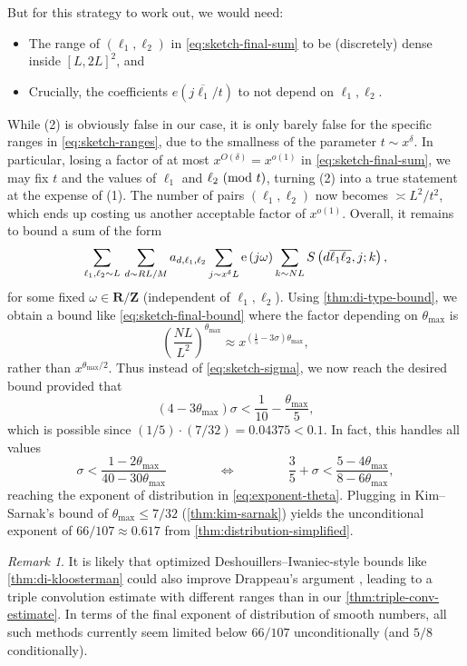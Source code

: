 \documentclass[reqno,11pt]{amsart}
\theoremstyle{definition}
\theoremstyle{remark}
\newtheorem*{remark}{Remark}
\numberwithin{equation}{section}
\newcommand{\Z}{\mathbf{Z}}
\newcommand{\R}{\mathbf{R}}
\newcommand{\e}{\textnormal{e}}
\renewcommand{\bar}{\overline}
\renewcommand{\pmod}[1]{\ (\textnormal{mod } #1)}
\begin{document}
But for this strategy to work out, we would need:
\begin{itemize}
    \item[(1).] The range of $(\ell_1, \ell_2)$ in \cref{eq:sketch-final-sum} to be (discretely) dense inside $[L, 2L]^2$, and
    \item[(2).] Crucially, the coefficients $e\left(j \bar{\ell_1} / t \right)$ to not depend on $\ell_1, \ell_2$.
\end{itemize}
While (2) is obviously false in our case, it is only barely false for the specific ranges in \cref{eq:sketch-ranges}, due to the smallness of the parameter $t \sim x^\delta$. In particular, losing a factor of at most $x^{O(\delta)} = x^{o(1)}$ in \cref{eq:sketch-final-sum}, we may fix $t$ and the values of $\ell_1$ and $\ell_2 \pmod{t}$, turning (2) into a true statement at the expense of (1). The number of pairs $(\ell_1, \ell_2)$ now becomes $\asymp L^2/t^2$, which ends up costing us another acceptable factor of $x^{o(1)}$. Overall, it remains to bound a sum of the form
\begin{equation} \label{eq:sketch-kloosterman-2}
    \sum_{\ell_1,\ell_2 \sim L}\, \sum_{d \sim RL/M} a_{d,\ell_1,\ell_2} \sum_{j \sim x^\delta L} \e\left(j\omega\right) 
    \sum_{k \sim NL} S\left(d \bar{\ell_1 \ell_2}, j; k\right),
\end{equation}
for some fixed $\omega \in \R/\Z$ (independent of $\ell_1, \ell_2$). Using \cref{thm:di-type-bound}, we obtain a bound like \cref{eq:sketch-final-bound} where the factor depending on $\theta_{\max}$ is
\[
    \left(\frac{NL}{L^2}\right)^{\theta_{\max}} \approx x^{\left(\frac{1}{5}-3\sigma\right) \theta_{\max}},
\]
rather than $x^{\theta_{\max}/2}$. Thus instead of \cref{eq:sketch-sigma}, we now reach the desired bound provided that
\[
    \left(4 - 3\theta_{\max}\right)\sigma < \frac{1}{10} - \frac{\theta_{\max}}{5},
\]
which is possible since $(1/5) \cdot (7/32) = 0.04375 < 0.1$. In fact, this handles all values
\[
    \sigma < \frac{1-2\theta_{\max}}{40-30\theta_{\max}}
    \qquad\qquad 
    \iff 
    \qquad\qquad 
    \frac{3}{5} + \sigma < 
    \frac{5-4\theta_{\max}}{8-6\theta_{\max}},
\]
reaching the exponent of distribution in \cref{eq:exponent-theta}. Plugging in Kim--Sarnak's bound of $\theta_{\max} \le 7/32$ (\cref{thm:kim-sarnak}) yields the unconditional exponent of $66/107 \approx 0.617$ from \cref{thm:distribution-simplified}.


\begin{remark}
It is likely that optimized Deshouillers--Iwaniec-style bounds like \cref{thm:di-kloosterman} could also improve Drappeau's argument \cite{drappeau2015theoremes}, leading to a triple convolution estimate with different ranges than in our \cref{thm:triple-conv-estimate}. In terms of the final exponent of distribution of smooth numbers, all such methods currently seem limited below $66/107$ unconditionally (and $5/8$ conditionally).
\end{remark}
\end{document}
